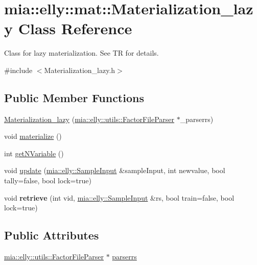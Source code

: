 \hypertarget{classmia_1_1elly_1_1mat_1_1_materialization__lazy}{\section{mia\-:\-:elly\-:\-:mat\-:\-:Materialization\-\_\-lazy Class Reference}
\label{classmia_1_1elly_1_1mat_1_1_materialization__lazy}
}


Class for lazy materialization. See T\-R for details.  




{\ttfamily \#include $<$Materialization\-\_\-lazy.\-h$>$}

\subsection*{Public Member Functions}
\begin{DoxyCompactItemize}
\item 
\hyperlink{classmia_1_1elly_1_1mat_1_1_materialization__lazy_ab3a242c373540574d1344de869014d3c}{Materialization\-\_\-lazy} (\hyperlink{classmia_1_1elly_1_1utils_1_1_factor_file_parser}{mia\-::elly\-::utils\-::\-Factor\-File\-Parser} $\ast$\-\_\-parserrs)
\item 
void \hyperlink{classmia_1_1elly_1_1mat_1_1_materialization__lazy_abc0e82ad824af5cef8708180fc3bf901}{materialize} ()
\item 
int \hyperlink{classmia_1_1elly_1_1mat_1_1_materialization__lazy_a4666c03c8a226bba1a199a9012c48ff6}{get\-N\-Variable} ()
\item 
void \hyperlink{classmia_1_1elly_1_1mat_1_1_materialization__lazy_a13de851c8bbb02bc4b56317eb5861eb0}{update} (\hyperlink{classmia_1_1elly_1_1_sample_input}{mia\-::elly\-::\-Sample\-Input} \&sample\-Input, int newvalue, bool tally=false, bool lock=true)
\item 
\hypertarget{classmia_1_1elly_1_1mat_1_1_materialization__lazy_aa9ad91dc3357563461402a65d92d643a}{void {\bfseries retrieve} (int vid, \hyperlink{classmia_1_1elly_1_1_sample_input}{mia\-::elly\-::\-Sample\-Input} \&rs, bool train=false, bool lock=true)}\label{classmia_1_1elly_1_1mat_1_1_materialization__lazy_aa9ad91dc3357563461402a65d92d643a}

\end{DoxyCompactItemize}
\subsection*{Public Attributes}
\begin{DoxyCompactItemize}
\item 
\hyperlink{classmia_1_1elly_1_1utils_1_1_factor_file_parser}{mia\-::elly\-::utils\-::\-Factor\-File\-Parser} $\ast$ \hyperlink{classmia_1_1elly_1_1mat_1_1_materialization__lazy_a3425cb0aefa4c9423085c2b164aaacd4}{parserrs}
\end{DoxyCompactItemize}


